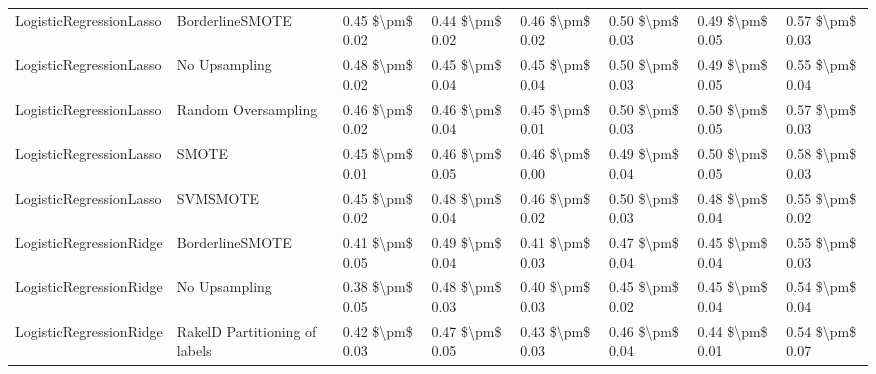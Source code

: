\begin{tabular}{llllllll}
        LogisticRegressionLasso &               BorderlineSMOTE & 0.45 \$\textbackslash pm\$ 0.02 &           0.44 \$\textbackslash pm\$ 0.02 &       0.46 \$\textbackslash pm\$ 0.02 &        0.50 \$\textbackslash pm\$ 0.03 &                         0.49 \$\textbackslash pm\$ 0.05 &     0.57 \$\textbackslash pm\$ 0.03 \\
        LogisticRegressionLasso &                 No Upsampling & 0.48 \$\textbackslash pm\$ 0.02 &           0.45 \$\textbackslash pm\$ 0.04 &       0.45 \$\textbackslash pm\$ 0.04 &        0.50 \$\textbackslash pm\$ 0.03 &                         0.49 \$\textbackslash pm\$ 0.05 &     0.55 \$\textbackslash pm\$ 0.04 \\
        LogisticRegressionLasso &           Random Oversampling & 0.46 \$\textbackslash pm\$ 0.02 &           0.46 \$\textbackslash pm\$ 0.04 &       0.45 \$\textbackslash pm\$ 0.01 &        0.50 \$\textbackslash pm\$ 0.03 &                         0.50 \$\textbackslash pm\$ 0.05 &     0.57 \$\textbackslash pm\$ 0.03 \\
        LogisticRegressionLasso &                         SMOTE & 0.45 \$\textbackslash pm\$ 0.01 &           0.46 \$\textbackslash pm\$ 0.05 &       0.46 \$\textbackslash pm\$ 0.00 &        0.49 \$\textbackslash pm\$ 0.04 &                         0.50 \$\textbackslash pm\$ 0.05 &     0.58 \$\textbackslash pm\$ 0.03 \\
        LogisticRegressionLasso &                      SVMSMOTE & 0.45 \$\textbackslash pm\$ 0.02 &           0.48 \$\textbackslash pm\$ 0.04 &       0.46 \$\textbackslash pm\$ 0.02 &        0.50 \$\textbackslash pm\$ 0.03 &                         0.48 \$\textbackslash pm\$ 0.04 &     0.55 \$\textbackslash pm\$ 0.02 \\
        LogisticRegressionRidge &               BorderlineSMOTE & 0.41 \$\textbackslash pm\$ 0.05 &           0.49 \$\textbackslash pm\$ 0.04 &       0.41 \$\textbackslash pm\$ 0.03 &        0.47 \$\textbackslash pm\$ 0.04 &                         0.45 \$\textbackslash pm\$ 0.04 &     0.55 \$\textbackslash pm\$ 0.03 \\
        LogisticRegressionRidge &                 No Upsampling & 0.38 \$\textbackslash pm\$ 0.05 &           0.48 \$\textbackslash pm\$ 0.03 &       0.40 \$\textbackslash pm\$ 0.03 &        0.45 \$\textbackslash pm\$ 0.02 &                         0.45 \$\textbackslash pm\$ 0.04 &     0.54 \$\textbackslash pm\$ 0.04 \\
        LogisticRegressionRidge & RakelD Partitioning of labels & 0.42 \$\textbackslash pm\$ 0.03 &           0.47 \$\textbackslash pm\$ 0.05 &       0.43 \$\textbackslash pm\$ 0.03 &        0.46 \$\textbackslash pm\$ 0.04 &                         0.44 \$\textbackslash pm\$ 0.01 &     0.54 \$\textbackslash pm\$ 0.07 \\

\end{tabular}
